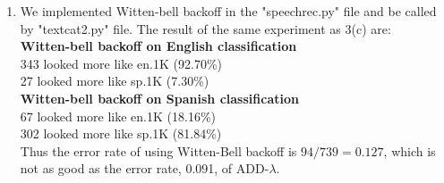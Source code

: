 \documentclass[10pt]{article}
\begin{document}
\begin{enumerate}
\begin{enumerate}
            \item %
            We implemented Witten-bell backoff in the "speechrec.py" file and be called by "textcat2.py" file. The result of the same experiment as 3(c) are:\\
            \textbf{Witten-bell backoff on English classification}\\
            343 looked more like en.1K (92.70\%)\\
            27 looked more like sp.1K (7.30\%)\\
            
            \textbf{Witten-bell backoff on Spanish classification}\\
            67 looked more like en.1K (18.16\%)\\
            302 looked more like sp.1K (81.84\%)\\

            Thus the error rate of using Witten-Bell backoff is $94/739 = 0.127$, which is not as good as the error rate, 0.091, of ADD-$\lambda$. 
            
        \end{enumerate}
\end{enumerate}
\end{document}

